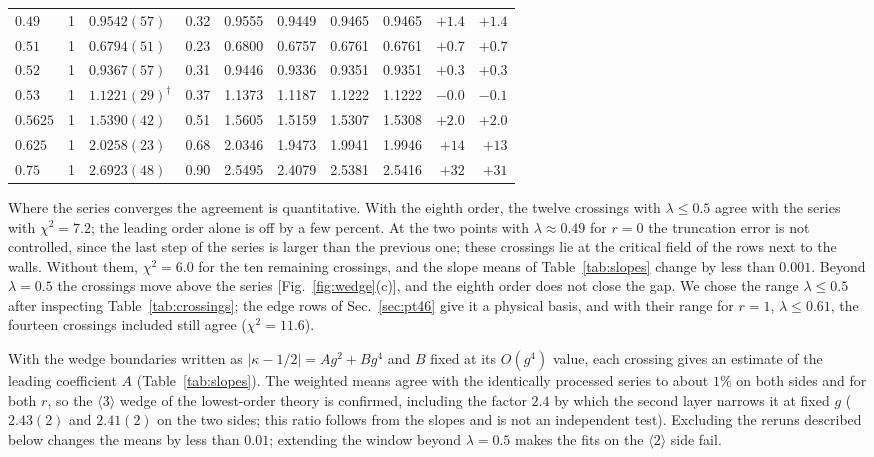 \documentclass[
 aps,prb,
 twocolumn,
 superscriptaddress,
 longbibliography,
 nofootinbib,
 floatfix
]{revtex4-2}
\begin{document}
\begin{table}
\begin{ruledtabular}
\begin{tabular}{llllllllrr}
$0.49$ & 1 & $0.9542(57)$ & 0.32 & 0.9555 & 0.9449 & 0.9465 & 0.9465 & $+1.4$ & $+1.4$ \\
$0.51$ & 1 & $0.6794(51)$ & 0.23 & 0.6800 & 0.6757 & 0.6761 & 0.6761 & $+0.7$ & $+0.7$ \\
$0.52$ & 1 & $0.9367(57)$ & 0.31 & 0.9446 & 0.9336 & 0.9351 & 0.9351 & $+0.3$ & $+0.3$ \\
$0.53$ & 1 & $1.1221(29)^\dagger$ & 0.37 & 1.1373 & 1.1187 & 1.1222 & 1.1222 & $-0.0$ & $-0.1$ \\
$0.5625$ & 1 & $1.5390(42)$ & 0.51 & 1.5605 & 1.5159 & 1.5307 & 1.5308 & $+2.0$ & $+2.0$ \\
$0.625$ & 1 & $2.0258(23)$ & 0.68 & 2.0346 & 1.9473 & 1.9941 & 1.9946 & $+14$ & $+13$ \\
$0.75$ & 1 & $2.6923(48)$ & 0.90 & 2.5495 & 2.4079 & 2.5381 & 2.5416 & $+32$ & $+31$ \\
\end{tabular}
\end{ruledtabular}
\end{table}

Where the series converges the agreement is quantitative. With the eighth order, the twelve crossings with
$\lambda\le0.5$ agree with the series with $\chi^2=7.2$; the leading order alone is off by a few percent. At the two
points with $\lambda\approx0.49$ for $r=0$ the truncation error is not controlled, since the last step of the series is
larger than the previous one; these crossings lie at the critical field of the rows next to the walls. Without them, $\chi^2=6.0$ for the ten
remaining crossings, and the slope means of Table~\ref{tab:slopes} change by less than $0.001$.
Beyond
$\lambda=0.5$ the crossings move above the series [Fig.~\ref{fig:wedge}(c)], and the eighth order does not close the
gap. We chose the range $\lambda\le0.5$ after inspecting Table~\ref{tab:crossings}; the edge rows of
Sec.~\ref{sec:pt46} give it a physical basis, and with their range for $r=1$, $\lambda\le0.61$, the fourteen crossings
included still agree ($\chi^2=11.6$).

With the wedge boundaries written as $|\kappa-1/2|=Ag^2+Bg^4$ and $B$ fixed at its $O(g^4)$ value, each crossing gives an
estimate of the leading coefficient $A$ (Table~\ref{tab:slopes}). The weighted means agree with the identically processed
series to about $1\%$ on both sides and for both $r$, so the $\langle3\rangle$ wedge of the lowest-order theory is
confirmed, including the factor $2.4$ by which the second layer narrows it at fixed $g$ ($2.43(2)$ and $2.41(2)$ on the two sides; this
ratio follows from the slopes and is not an independent test). Excluding the reruns described below changes the means
by less than $0.01$; extending the window beyond $\lambda=0.5$ makes the fits on the $\langle2\rangle$ side fail.
\end{document}
